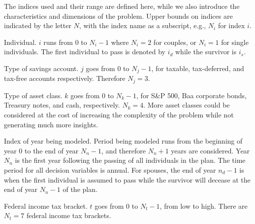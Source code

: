 \documentclass{report}[fleqn,12pt]
\begin{document}
The indices used and their range are defined here, while we also
introduce the characteristics and dimensions of the problem.
Upper bounds on indices are indicated by the letter $N$, with the
index name as a subscript, e.g., $N_i$ for index $i$.
\begin{description}[leftmargin=4em,style=multiline]
\item [$i$]
	Individual. $i$ runs from 0 to $N_i - 1$ where $N_i = 2$ for couples,
	or $N_i= 1$ for single individuals. The first individual to pass
		is denoted by $i_d$ while the survivor is $i_s$.
\item [$j$]
	Type of savings account. $j$ goes from 0 to $N_j - 1$, for taxable, tax-deferred,
	and tax-free accounts respectively. Therefore $N_j = 3$.
\item[$k$]
	Type of asset class. $k$ goes from 0 to $N_k -1 $, for S\&P 500,
	Baa corporate bonds, Treasury notes, and cash, respectively. $N_k = 4$.
	More asset classes could be considered at the cost of increasing
	the complexity of the problem while not generating much more insights.
\item [$n$]
	Index of year being modeled. Period being modeled runs from the beginning of year 0 to 
	the end of year $N_n-1$, and therefore $N_n + 1$ years are considered.
	Year $N_n$ is the first year following the passing of all
	individuals in the plan. The time period for all decision variables is annual.
	For spouses, the end of year $n_d-1$ is when the first individual is assumed to pass while
	the survivor will decease at the end of year $N_n-1$ of the plan.
\item [$t$]
	Federal income tax bracket. $t$ goes from 0 to $N_t - 1$, from low to high.
	There are $N_t = 7$ federal income tax brackets.
\end{description}
\end{document}
